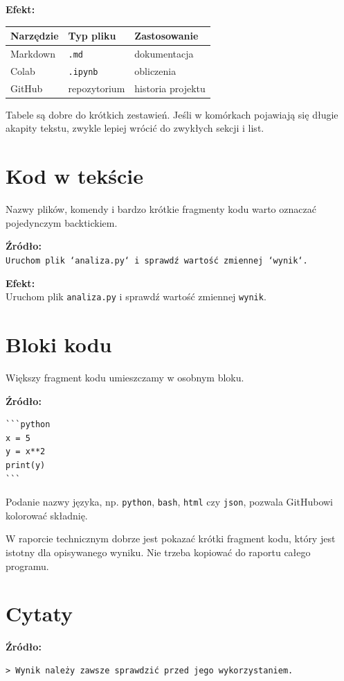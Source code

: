 \documentclass[12pt, a4paper]{article}
\begin{document}
\textbf{Efekt:}
\begin{table}[h]
\centering
\begin{tabular}{lll}
\toprule
\textbf{Narzędzie} & \textbf{Typ pliku} & \textbf{Zastosowanie} \\
\midrule
Markdown & \texttt{.md} & dokumentacja \\
Colab & \texttt{.ipynb} & obliczenia \\
GitHub & repozytorium & historia projektu \\
\bottomrule
\end{tabular}
\end{table}

Tabele są dobre do krótkich zestawień. Jeśli w komórkach pojawiają się długie akapity tekstu, zwykle lepiej wrócić do zwykłych sekcji i list.

\section{Kod w tekście}
Nazwy plików, komendy i bardzo krótkie fragmenty kodu warto oznaczać pojedynczym backtickiem.

\textbf{Źródło:}\\
\texttt{Uruchom plik `analiza.py` i sprawdź wartość zmiennej `wynik`.}

\textbf{Efekt:}\\
Uruchom plik \texttt{analiza.py} i sprawdź wartość zmiennej \texttt{wynik}.

\section{Bloki kodu}
Większy fragment kodu umieszczamy w osobnym bloku.

\textbf{Źródło:}
\begin{lstlisting}
```python
x = 5
y = x**2
print(y)
```
\end{lstlisting}

Podanie nazwy języka, np. \texttt{python}, \texttt{bash}, \texttt{html} czy \texttt{json}, pozwala GitHubowi kolorować składnię.

W raporcie technicznym dobrze jest pokazać krótki fragment kodu, który jest istotny dla opisywanego wyniku. Nie trzeba kopiować do raportu całego programu.

\section{Cytaty}

\textbf{Źródło:}
\begin{verbatim}
> Wynik należy zawsze sprawdzić przed jego wykorzystaniem.
\end{verbatim}
\end{document}
